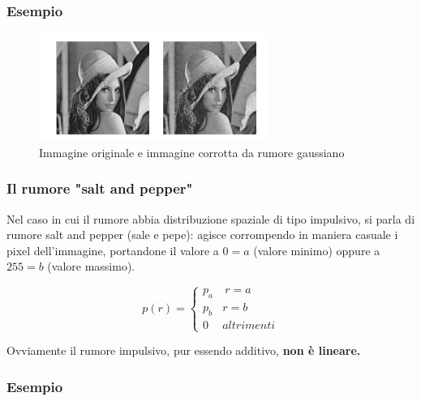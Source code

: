 
\subsubsection{Esempio}

\begin{figure}[H]
    \centering
    \includegraphics[width=\linewidth, keepaspectratio]{capitoli/immagini/imgs/esempio-rumore.png}
    \caption*{Immagine originale e immagine corrotta da rumore gaussiano}
\end{figure}

\subsubsection{Il rumore "salt and pepper"}

Nel caso in cui il rumore abbia distribuzione spaziale di tipo impulsivo, si parla di rumore salt and pepper (sale e pepe): agisce
corrompendo in maniera casuale i pixel dell'immagine, portandone il valore a $0=a$ (valore minimo) oppure a $255=b$ (valore massimo).
\begin{center}
    $$
        p(r) = \left\{ \begin{array}{cl}
            p_a & \ r = a    \\
            p_b & r = b      \\
            0   & altrimenti
        \end{array} \right.
    $$
\end{center}
Ovviamente il rumore impulsivo, pur essendo additivo, \textbf{non è
    lineare.}


\subsubsection{Esempio}

